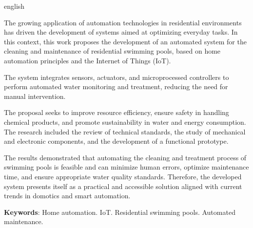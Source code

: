 \begin{resumo}[Abstract]

\begin{otherlanguage*}{english}

The growing application of automation technologies in residential environments has driven the development of systems aimed at optimizing everyday tasks. In this context, this work proposes the development of an automated system for the cleaning and maintenance of residential swimming pools, based on home automation principles and the Internet of Things (IoT).

The system integrates sensors, actuators, and microprocessed controllers to perform automated water monitoring and treatment, reducing the need for manual intervention.

The proposal seeks to improve resource efficiency, ensure safety in handling chemical products, and promote sustainability in water and energy consumption. The research included the review of technical standards, the study of mechanical and electronic components, and the development of a functional prototype.

The results demonstrated that automating the cleaning and treatment process of swimming pools is feasible and can minimize human errors, optimize maintenance time, and ensure appropriate water quality standards. Therefore, the developed system presents itself as a practical and accessible solution aligned with current trends in domotics and smart automation.

		\vspace{\onelineskip}
		
		\noindent 
		\textbf{Keywords}: Home automation. IoT. Residential swimming pools. Automated maintenance.
	\end{otherlanguage*}
\end{resumo}